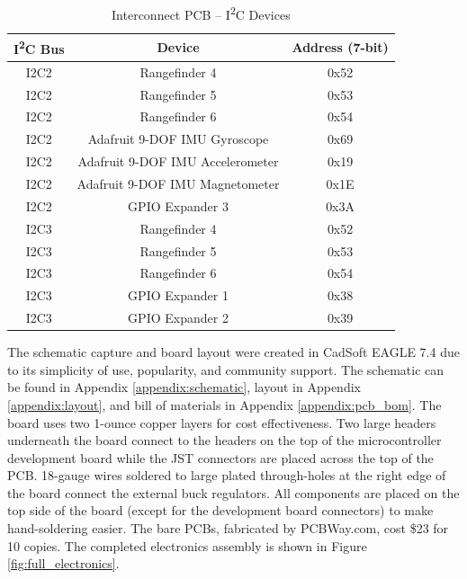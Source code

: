 \begin{table}[h]
	\centering	\caption{Interconnect PCB -- I\textsuperscript{2}C Devices}
	\begin{tabular}{ccc}
		\hline 
		\multicolumn{1}{c}{I\textsuperscript{2}C Bus} & Device & Address (7-bit) \\ \hline 
		I2C2 & Rangefinder 4 & 0x52 \\ \hline 
		I2C2 & Rangefinder 5 & 0x53 \\ \hline 
		I2C2 & Rangefinder 6 & 0x54 \\ \hline 
		I2C2 & Adafruit 9-DOF IMU Gyroscope & 0x69 \\ \hline
		I2C2 & Adafruit 9-DOF IMU Accelerometer & 0x19\\ \hline		
		I2C2 & Adafruit 9-DOF IMU Magnetometer & 0x1E \\ \hline		
		I2C2 & GPIO Expander 3 & 0x3A \\ \hline				
		I2C3 & Rangefinder 4 & 0x52 \\ \hline 
		I2C3 & Rangefinder 5 & 0x53 \\ \hline 
		I2C3 & Rangefinder 6 & 0x54 \\ \hline 
		I2C3 & GPIO Expander 1 & 0x38 \\ \hline				
		I2C3 & GPIO Expander 2 & 0x39 \\ \hline				
	\end{tabular} 
	\label{tab:i2c_table}
\end{table}

The schematic capture and board layout were created in CadSoft EAGLE 7.4 due to its simplicity of use, popularity, and community support. The schematic can be found in Appendix \ref{appendix:schematic}, layout in Appendix \ref{appendix:layout}, and bill of materials in Appendix  \ref{appendix:pcb_bom}. The board uses two 1-ounce copper layers for cost effectiveness. Two large headers underneath the board connect to the headers on the top of the microcontroller development board while the JST connectors are placed across the top of the PCB. 18-gauge wires soldered to large plated through-holes at the right edge of the board connect the external buck regulators. All components are placed on the top side of the board (except for the development board connectors) to make hand-soldering easier. The bare PCBs, fabricated by PCBWay.com, cost \$23 for 10 copies. The completed electronics assembly is shown in Figure \ref{fig:full_electronics}.

